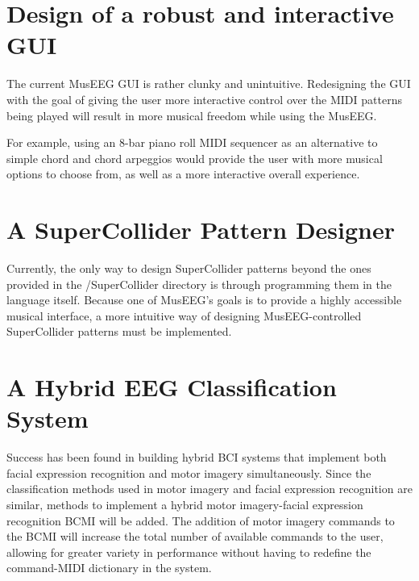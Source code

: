 \section{Design of a robust and interactive GUI}
The current MusEEG GUI is rather clunky and unintuitive. Redesigning the GUI with the goal of giving the user more interactive control over the MIDI patterns being played will result in more musical freedom while using the MusEEG. 

For example, using an 8-bar piano roll MIDI sequencer as an alternative to simple chord and chord arpeggios would provide the user with more musical options to choose from, as well as a more interactive overall experience. 

\section{A SuperCollider Pattern Designer}
Currently, the only way to design SuperCollider patterns beyond the ones provided in the /SuperCollider directory is through programming them in the language itself. Because one of MusEEG's goals is to provide a highly accessible musical interface, a more intuitive way of designing MusEEG-controlled SuperCollider patterns must be implemented. 


\section{A Hybrid EEG Classification System}
Success has been found in building hybrid BCI systems that implement both facial expression recognition and motor imagery simultaneously\cite{gsu:facialexpression}. Since the classification methods used in motor imagery and facial expression recognition are similar, methods to implement a hybrid motor imagery-facial expression recognition BCMI will be added. The addition of motor imagery commands to the BCMI will increase the total number of available commands to the user, allowing for greater variety in performance without having to redefine the command-MIDI dictionary in the system.
